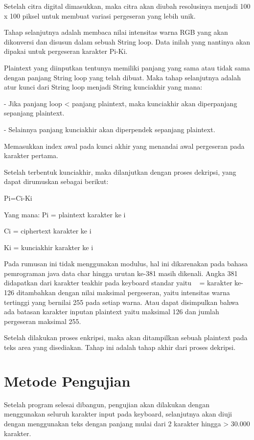 \documentclass{jtetiproposalskripsi}
\begin{document}
Setelah citra digital dimasukkan, maka citra akan diubah resolusinya menjadi 100 x 100 piksel untuk membuat variasi pergeseran yang lebih unik.

Tahap selanjutnya adalah membaca nilai intensitas warna RGB yang akan dikonversi dan disusun dalam sebuah String loop. Data inilah yang nantinya akan dipakai untuk pergeseran karakter Pi-Ki.

Plaintext yang diinputkan tentunya memiliki panjang yang sama atau tidak sama dengan panjang String loop yang telah dibuat. Maka tahap selanjutnya adalah atur kunci dari String loop menjadi String kunciakhir yang mana:

-	Jika panjang loop < panjang plaintext, maka kunciakhir akan diperpanjang sepanjang plaintext.

-	Selainnya panjang kunciakhir akan diperpendek sepanjang plaintext.

Memasukkan index awal pada kunci akhir yang menandai awal pergeseran pada karakter pertama.

Setelah terbentuk kunciakhir, maka dilanjutkan dengan proses dekripsi, yang dapat dirumuskan sebagai berikut:

Pi=Ci-Ki
 
Yang mana:    Pi  = plaintext karakter ke i

Ci	= ciphertext karakter ke i

Ki	= kunciakhir karakter ke i

Pada rumusan ini tidak menggunakan modulus, hal ini dikarenakan pada bahasa pemrograman java data char hingga urutan ke-381 masih dikenali. Angka 381 didapatkan dari karakter teakhir pada keyboard standar yaitu ~ = karakter ke-126 ditambahkan dengan nilai maksimal pergeseran, yaitu intensitas warna tertinggi yang bernilai 255 pada setiap warna. Atau dapat disimpulkan bahwa ada batasan karakter inputan plaintext yaitu maksimal 126 dan jumlah pergeseran maksimal 255.

Setelah dilakukan proses enkripsi, maka akan ditampilkan sebuah plaintext pada teks area yang disediakan. Tahap ini adalah tahap akhir dari proses dekripsi.

\section{Metode Pengujian}
Setelah program selesai dibangun, pengujian akan dilakukan dengan menggunakan seluruh karakter input pada keyboard, selanjutnya akan diuji dengan menggunakan teks dengan panjang mulai dari 2 karakter hingga > 30.000 karakter.
\end{document}
